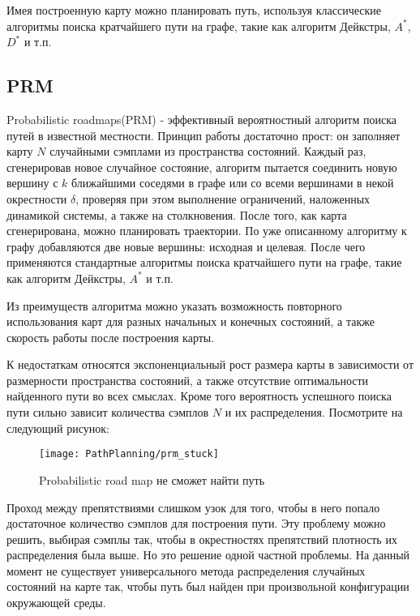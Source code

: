 Имея построенную карту можно планировать путь, используя классические алгоритмы поиска кратчайшего пути на графе, такие как алгоритм Дейкстры, $A^{*}$, $D^{*}$ и т.п.

\subsection{PRM}\label{subsect4_2_2}
Probabilistic roadmaps(PRM) - эффективный вероятностный алгоритм поиска путей в известной местности. Принцип работы достаточно прост: он заполняет карту $N$ случайными сэмплами из пространства состояний. Каждый раз, сгенерировав новое случайное состояние, алгоритм пытается соединить новую вершину с $k$ ближайшими соседями в графе или со всеми вершинами в некой окрестности $\delta$, проверяя при этом выполнение ограничений, наложенных динамикой системы, а также на столкновения. После того, как карта сгенерирована, можно планировать траектории. По уже описанному алгоритму к графу добавляются две новые вершины: исходная и целевая. После чего применяются стандартные алгоритмы поиска кратчайшего пути на графе, такие как алгоритм Дейкстры\cite{CLRS}, $A^{*}$\cite{AStarWiki} и т.п.

Из преимуществ алгоритма можно указать возможность повторного использования карт для разных начальных и конечных состояний, а также скорость работы после построения карты.

К недостаткам относятся экспоненциальный рост размера карты в зависимости от размерности пространства состояний, а также отсутствие оптимальности найденного пути во всех смыслах. Кроме того вероятность успешного поиска пути сильно зависит количества сэмплов $N$ и их распределения. Посмотрите на следующий рисунок:

\begin{figure}[ht]
    \centering
    \texttt{[image: PathPlanning/prm\_stuck]}
    \caption{Probabilistic road map не сможет найти путь}
\end{figure}

Проход между препятствиями слишком узок для того, чтобы в него попало достаточное количество сэмплов для построения пути. Эту проблему можно решить, выбирая сэмплы так, чтобы в окрестностях препятствий плотность их распределения была выше. Но это решение одной частной проблемы. На данный момент не существует универсального метода распределения случайных состояний на карте так, чтобы путь был найден при произвольной конфигурации окружающей среды.\cite{CourseraMotionPlanning}

